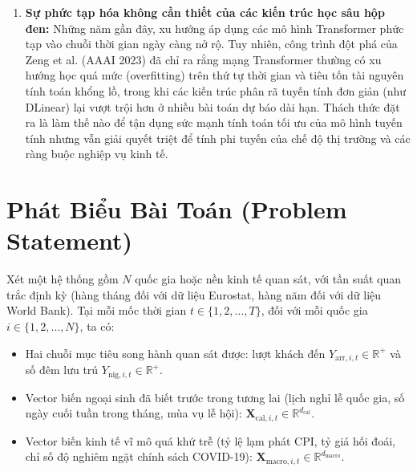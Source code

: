 \begin{enumerate}
    \item \textbf{Sự phức tạp hóa không cần thiết của các kiến trúc học sâu hộp đen:} Những năm gần đây, xu hướng áp dụng các mô hình Transformer phức tạp vào chuỗi thời gian ngày càng nở rộ. Tuy nhiên, công trình đột phá của Zeng et al. (AAAI 2023) \cite{zeng2023dlinear} đã chỉ ra rằng mạng Transformer thường có xu hướng học quá mức (overfitting) trên thứ tự thời gian và tiêu tốn tài nguyên tính toán khổng lồ, trong khi các kiến trúc phân rã tuyến tính đơn giản (như DLinear) lại vượt trội hơn ở nhiều bài toán dự báo dài hạn. Thách thức đặt ra là làm thế nào để tận dụng sức mạnh tính toán tối ưu của mô hình tuyến tính nhưng vẫn giải quyết triệt để tính phi tuyến của chế độ thị trường và các ràng buộc nghiệp vụ kinh tế.
\end{enumerate}

\section{Phát Biểu Bài Toán (Problem Statement)}
\label{sec:problem_statement}

Xét một hệ thống gồm $N$ quốc gia hoặc nền kinh tế quan sát, với tần suất quan trắc định kỳ (hàng tháng đối với dữ liệu Eurostat, hàng năm đối với dữ liệu World Bank). Tại mỗi mốc thời gian $t \in \{1, 2, \dots, T\}$, đối với mỗi quốc gia $i \in \{1, 2, \dots, N\}$, ta có:
\begin{itemize}
    \item Hai chuỗi mục tiêu song hành quan sát được: lượt khách đến $Y_{\text{arr}, i, t} \in \mathbb{R}^+$ và số đêm lưu trú $Y_{\text{nig}, i, t} \in \mathbb{R}^+$.
    \item Vector biến ngoại sinh đã biết trước trong tương lai (lịch nghỉ lễ quốc gia, số ngày cuối tuần trong tháng, mùa vụ lễ hội): $\mathbf{X}_{\text{cal}, i, t} \in \mathbb{R}^{d_{\text{cal}}}$.
    \item Vector biến kinh tế vĩ mô quá khứ trễ (tỷ lệ lạm phát CPI, tỷ giá hối đoái, chỉ số độ nghiêm ngặt chính sách COVID-19): $\mathbf{X}_{\text{macro}, i, t} \in \mathbb{R}^{d_{\text{macro}}}$.
\end{itemize}

